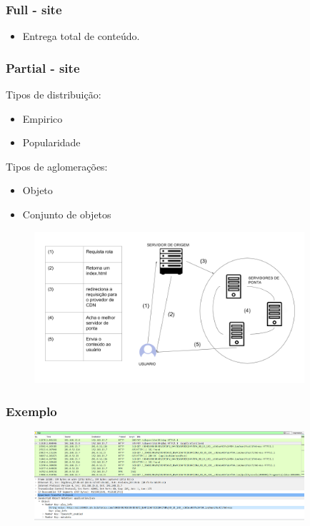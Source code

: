 \subsubsection{Full - site}
\begin{itemize}
	\item Entrega total de conte\'udo.
\end{itemize}

\subsubsection{Partial - site}

Tipos de distribui\c{c}\~ao:
\begin{itemize}
	\item Empirico
	\item Popularidade
\end{itemize}
Tipos de aglomera\c{c}\~oes:
\begin{itemize}
	\item Objeto
	\item Conjunto de objetos
\end{itemize}

\begin{figure}[h]
\includegraphics[width=10cm]{Figuras/entrega_conteudo.png} 
\label{figura:entrega_conteudo}
\end{figure}

\subsubsection{Exemplo}

\begin{figure}[h]
\includegraphics[width=10cm]{Figuras/exemplo_vod_1.png} 
\label{figura:exemplo_vod_1}
\end{figure}

